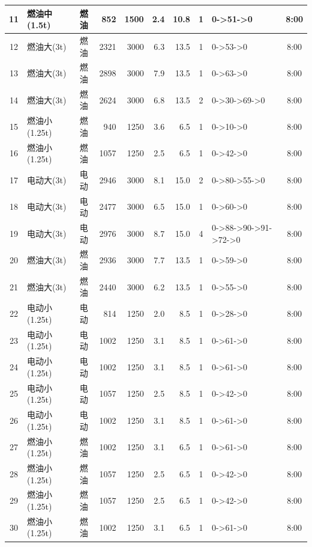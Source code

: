 \begin{landscape}
\begin{longtable}{|c|l|c|r|r|r|r|c|p{2.8cm}|c|}
\hline
\rowcolor{gray!8}
11 & 燃油中(1.5t) & 燃油 & 852 & 1500 & 2.4 & 10.8 & 1 & 0->51->0 & 8:00 \\
\hline
12 & 燃油大(3t) & 燃油 & 2321 & 3000 & 6.3 & 13.5 & 1 & 0->53->0 & 8:00 \\
\hline
\rowcolor{gray!8}
13 & 燃油大(3t) & 燃油 & 2898 & 3000 & 7.9 & 13.5 & 1 & 0->63->0 & 8:00 \\
\hline
14 & 燃油大(3t) & 燃油 & 2624 & 3000 & 6.8 & 13.5 & 2 & 0->30->69->0 & 8:00 \\
\hline
\rowcolor{gray!8}
15 & 燃油小(1.25t) & 燃油 & 940 & 1250 & 3.6 & 6.5 & 1 & 0->10->0 & 8:00 \\
\hline
16 & 燃油小(1.25t) & 燃油 & 1057 & 1250 & 2.5 & 6.5 & 1 & 0->42->0 & 8:00 \\
\hline
\rowcolor{gray!8}
17 & 电动大(3t) & 电动 & 2946 & 3000 & 8.1 & 15.0 & 2 & 0->80->55->0 & 8:00 \\
\hline
18 & 电动大(3t) & 电动 & 2477 & 3000 & 6.5 & 15.0 & 1 & 0->60->0 & 8:00 \\
\hline
\rowcolor{gray!8}
19 & 电动大(3t) & 电动 & 2976 & 3000 & 8.7 & 15.0 & 4 & 0->88->90->91->72->0 & 8:00 \\
\hline
20 & 燃油大(3t) & 燃油 & 2936 & 3000 & 7.7 & 13.5 & 1 & 0->59->0 & 8:00 \\
\hline
\rowcolor{gray!8}
21 & 燃油大(3t) & 燃油 & 2440 & 3000 & 6.2 & 13.5 & 1 & 0->55->0 & 8:00 \\
\hline
22 & 电动小(1.25t) & 电动 & 814 & 1250 & 2.0 & 8.5 & 1 & 0->28->0 & 8:00 \\
\hline
\rowcolor{gray!8}
23 & 电动小(1.25t) & 电动 & 1002 & 1250 & 3.1 & 8.5 & 1 & 0->61->0 & 8:00 \\
\hline
24 & 电动小(1.25t) & 电动 & 1002 & 1250 & 3.1 & 8.5 & 1 & 0->61->0 & 8:00 \\
\hline
\rowcolor{gray!8}
25 & 电动小(1.25t) & 电动 & 1057 & 1250 & 2.5 & 8.5 & 1 & 0->42->0 & 8:00 \\
\hline
26 & 电动小(1.25t) & 电动 & 1002 & 1250 & 3.1 & 8.5 & 1 & 0->61->0 & 8:00 \\
\hline
\rowcolor{gray!8}
27 & 燃油小(1.25t) & 燃油 & 1002 & 1250 & 3.1 & 6.5 & 1 & 0->61->0 & 8:00 \\
\hline
28 & 燃油小(1.25t) & 燃油 & 1057 & 1250 & 2.5 & 6.5 & 1 & 0->42->0 & 8:00 \\
\hline
\rowcolor{gray!8}
29 & 燃油小(1.25t) & 燃油 & 1057 & 1250 & 2.5 & 6.5 & 1 & 0->42->0 & 8:00 \\
\hline
30 & 燃油小(1.25t) & 燃油 & 1002 & 1250 & 3.1 & 6.5 & 1 & 0->61->0 & 8:00 \\

\end{longtable}
\end{landscape}
